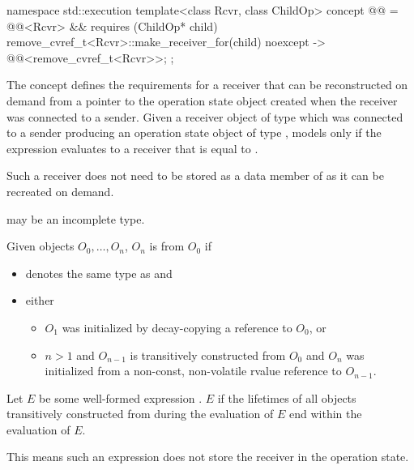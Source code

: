 \pnum
\begin{codeblock}
namespace std::execution {
  template<class Rcvr, class ChildOp>
    concept @@ = @@<Rcvr> &&
      requires (ChildOp* child) {
        { remove_cvref_t<Rcvr>::make_receiver_for(child) } noexcept
          -> @@<remove_cvref_t<Rcvr>>;
      };
}
\end{codeblock}

The  concept
defines the requirements for a receiver
that can be reconstructed on demand
from a pointer to the operation state object
created when the receiver was connected to a sender.
Given a receiver object  of type 
which was connected to a sender producing
an operation state object  of type ,
 models 
only if the expression 
evaluates to a receiver
that is equal to .
\begin{note}
Such a receiver does not need to be stored as a data member of 
as it can be recreated on demand.
\end{note}
 may be an incomplete type.

\pnum
Given objects $O_0, \dotsc, O_n$,
$O_n$ is  from $O_0$ if
\begin{itemize}
\item
{}
denotes the same type as
 and
\item
either
\begin{itemize}
\item
$O_1$ was initialized by decay-copying a reference to $O_0$, or
\item
$n > 1$ and $O_{n-1}$ is transitively constructed from $O_0$ and
$O_n$ was initialized from
a non-const, non-volatile rvalue reference to $O_{n-1}$.
\end{itemize}
\end{itemize}

\pnum
Let $E$ be some well-formed expression .
$E$  
if the lifetimes of all objects transitively constructed from
 during the evaluation of $E$
end within the evaluation of $E$.
\begin{note}
This means such an expression does not store the receiver in the operation state.
\end{note}


